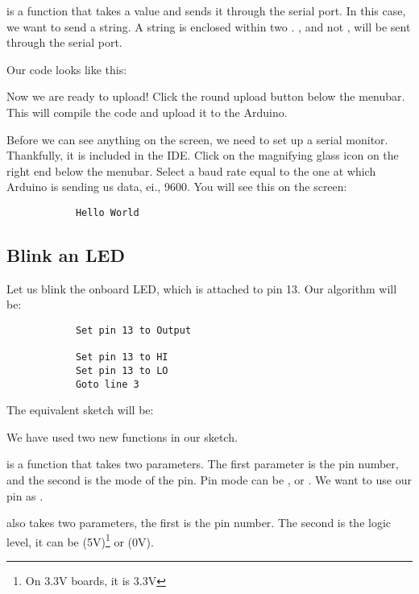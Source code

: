 \documentclass{article}
\begin{document}
			 is a function that takes a value and sends it through the serial port. In this case, we want to send a string. A string is enclosed within two . , and not , will be sent through the serial port.

			Our code looks like this:

			

			Now we are ready to upload! Click the round upload button below the menubar. This will compile the code and upload it to the Arduino.

			Before we can see anything on the screen, we need to set up a serial monitor. Thankfully, it is included in the IDE. Click on the magnifying glass icon on the right end below the menubar. Select a baud rate equal to the one at which Arduino is sending us data, ei., 9600. You will see this on the screen:

			\begin{lstlisting}
			Hello World
			\end{lstlisting}

		\subsection{Blink an LED}

			Let us blink the onboard LED, which is attached to pin 13. Our algorithm will be:

			\begin{lstlisting}
			Set pin 13 to Output

			Set pin 13 to HI
			Set pin 13 to LO
			Goto line 3
			\end{lstlisting}

			The equivalent sketch will be:

			

			We have used two new functions in our sketch.

			 is a function that takes two parameters. The first parameter is the pin number, and the second is the mode of the pin. Pin mode can be  ,  or . We want to use our pin as .

			 also takes two parameters, the first is the pin number. The second is the logic level, it can be  (5V)\footnote{On 3.3V boards, it is 3.3V} or  (0V).
\end{document}
